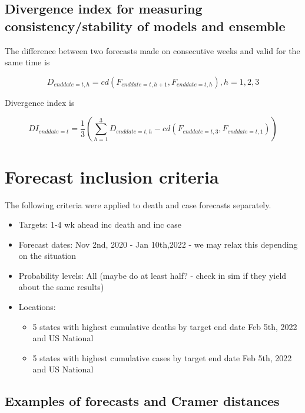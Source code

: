 \documentclass[
]{article}
\providecommand{\tightlist}{%
  \setlength{\itemsep}{0pt}\setlength{\parskip}{0pt}}
\begin{document}
\hypertarget{divergence-index-for-measuring-consistencystability-of-models-and-ensemble}{%
\subsection{Divergence index for measuring consistency/stability of
models and
ensemble}\label{divergence-index-for-measuring-consistencystability-of-models-and-ensemble}}

The difference between two forecasts made on consecutive weeks and valid
for the same time is

\[
D_{enddate=t,h}=cd(F_{enddate=t,h+1},F_{enddate=t,h}), h=1,2,3
\]

Divergence index is

\[
DI_{enddate=t}=\frac{1}{3}(\sum^{3}_{h=1} D_{enddate=t,h}-cd(F_{enddate=t,3},F_{enddate=t,1}))
\]

\hypertarget{forecast-inclusion-criteria}{%
\section{Forecast inclusion
criteria}\label{forecast-inclusion-criteria}}

The following criteria were applied to death and case forecasts
separately.

\begin{itemize}
\tightlist
\item
  Targets: 1-4 wk ahead inc death and inc case
\item
  Forecast dates: Nov 2nd, 2020 - Jan 10th,2022 - we may relax this
  depending on the situation
\item
  Probability levels: All (maybe do at least half? - check in sim if
  they yield about the same results)
\item
  Locations:

  \begin{itemize}
  \tightlist
  \item
    5 states with highest cumulative deaths by target end date Feb 5th,
    2022 and US National
  \item
    5 states with highest cumulative cases by target end date Feb 5th,
    2022 and US National
  \end{itemize}
\end{itemize}

\hypertarget{examples-of-forecasts-and-cramer-distances}{%
\subsection{Examples of forecasts and Cramer
distances}\label{examples-of-forecasts-and-cramer-distances}}
\end{document}
